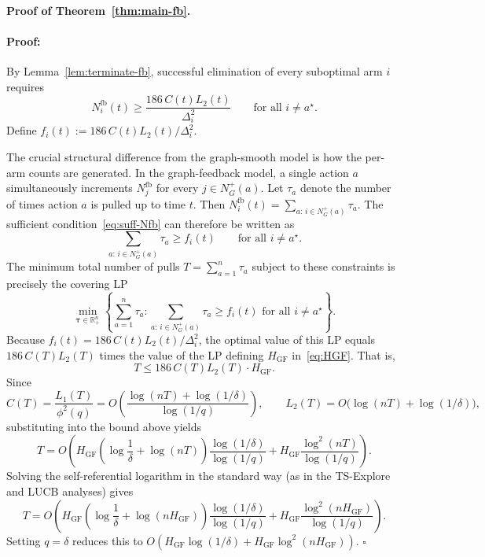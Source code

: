 \documentclass{article}
\newenvironment{proof}{\paragraph{Proof:}}{\hfill$\square$}
\begin{document}
\paragraph{Proof of Theorem~\ref{thm:main-fb}.}

\begin{proof}
By Lemma~\ref{lem:terminate-fb}, successful elimination of every suboptimal arm $i$ requires
\begin{equation}
\label{eq:suff-Nfb}
N_i^{\mathrm{fb}}(t)
\ge
\frac{186\,C(t)L_2(t)}{\Delta_i^2}
\qquad\text{for all }i\neq a^\star.
\end{equation}
Define $f_i(t):=186\,C(t)L_2(t)/\Delta_i^2$.

The crucial structural difference from the graph-smooth model is how the per-arm counts are generated. In the graph-feedback model, a single action $a$ simultaneously increments $N_j^{\mathrm{fb}}$ for every $j\in N_G^+(a)$. Let $\tau_a$ denote the number of times action $a$ is pulled up to time $t$. Then $N_i^{\mathrm{fb}}(t)=\sum_{a:\,i\in N_G^+(a)}\tau_a$. The sufficient condition~\eqref{eq:suff-Nfb} can therefore be written as
\[
\sum_{a:\,i\in N_G^+(a)}\tau_a \ge f_i(t)
\qquad\text{for all }i\neq a^\star.
\]
The minimum total number of pulls $T=\sum_{a=1}^n \tau_a$ subject to these constraints is precisely the covering LP
\[
\min_{\bm\tau\in\mathbb R_+^n}
\left\{
\sum_{a=1}^n \tau_a :
\sum_{a:\,i\in N_G^+(a)}\tau_a \ge f_i(t)
\text{ for all }i\neq a^\star
\right\}.
\]
Because $f_i(t)=186\,C(t)L_2(t)/\Delta_i^2$, the optimal value of this LP equals $186\,C(T)L_2(T)$ times the value of the LP defining $H_{\mathrm{GF}}$ in~\eqref{eq:HGF}. That is,
\[
T \le 186\,C(T)L_2(T)\cdot H_{\mathrm{GF}}.
\]
Since
\[
C(T)=\frac{L_1(T)}{\phi^2(q)}
= O\!\left(\frac{\log(nT)+\log(1/\delta)}{\log(1/q)}\right),
\qquad
L_2(T)=O\!\bigl(\log(nT)+\log(1/\delta)\bigr),
\]
substituting into the bound above yields
\[
T = O\!\left(
H_{\mathrm{GF}}
\left(\log\frac1\delta+\log(nT)\right)
\frac{\log(1/\delta)}{\log(1/q)}
+
H_{\mathrm{GF}}
\frac{\log^2(nT)}{\log(1/q)}
\right).
\]
Solving the self-referential logarithm in the standard way (as in the TS-Explore and LUCB analyses) gives
\[
T = O\!\left(
H_{\mathrm{GF}}
\left(\log\frac1\delta+\log(nH_{\mathrm{GF}})\right)
\frac{\log(1/\delta)}{\log(1/q)}
+
H_{\mathrm{GF}}
\frac{\log^2(nH_{\mathrm{GF}})}{\log(1/q)}
\right).
\]
Setting $q=\delta$ reduces this to $O\!\left(H_{\mathrm{GF}}\log(1/\delta)+H_{\mathrm{GF}}\log^2(nH_{\mathrm{GF}})\right)$.
\end{proof}
\end{document}
